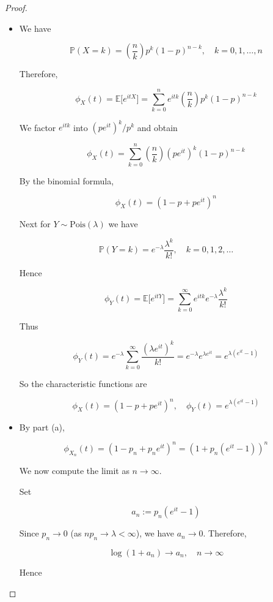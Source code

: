 \documentclass{qlnotes-export}
\begin{document}
\begin{proof}

\begin{itemize}
\item
  We have

  \[{\mathbb{P}}(X = k) = \left( \frac{n}{k} \right)p^{k}(1 - p)^{n - k},\quad k = 0,1,\ldots,n\]

  Therefore,

  \[\phi_{X}(t) = {\mathbb{E}}\lbrack e^{itX}\rbrack = \sum\limits_{k = 0}^{n}e^{itk}\left( \frac{n}{k} \right)p^{k}(1 - p)^{n - k}\]

  We factor \(e^{itk}\) into \((pe^{it})^{k}/p^{k}\) and obtain

  \[\phi_{X}(t) = \sum\limits_{k = 0}^{n}\left( \frac{n}{k} \right)(pe^{it})^{k}(1 - p)^{n - k}\]

  By the binomial formula,

  \[\phi_{X}(t) = (1 - p + pe^{it})^{n}\]

  Next for \(Y \sim \text{Pois}(\lambda)\) we have

  \[{\mathbb{P}}(Y = k) = e^{- \lambda}\frac{\lambda^{k}}{k!},\quad k = 0,1,2,\ldots\]

  Hence

  \[\phi_{Y}(t) = {\mathbb{E}}\lbrack e^{itY}\rbrack = \sum\limits_{k = 0}^{\infty}e^{itk}e^{- \lambda}\frac{\lambda^{k}}{k!}\]

  Thus

  \[\phi_{Y}(t) = e^{- \lambda}\sum\limits_{k = 0}^{\infty}\frac{(\lambda e^{it})^{k}}{k!} = e^{- \lambda}e^{\lambda e^{it}} = e^{\lambda(e^{it} - 1)}\]

  So the characteristic functions are

  \[\phi_{X}(t) = (1 - p + pe^{it})^{n},\quad\phi_{Y}(t) = e^{\lambda(e^{it} - 1)}\]
\item
  By part (a),

  \[\phi_{X_{n}}(t) = (1 - p_{n} + p_{n}e^{it})^{n} = \left( {1 + p_{n}(e^{it} - 1)} \right)^{n}\]

  We now compute the limit as \(n\rightarrow\infty\).

  Set

  \[a_{n} := p_{n}(e^{it} - 1)\]

  Since \(p_{n}\rightarrow 0\) (as \(np_{n}\rightarrow\lambda < \infty\)), we have \(a_{n}\rightarrow 0\). Therefore,

  \[\log(1 + a_{n})\rightarrow a_{n},\quad n\rightarrow\infty\]

  Hence


\end{itemize}
\end{proof}
\end{document}
